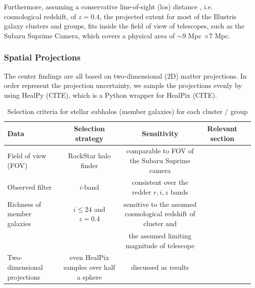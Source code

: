 \documentclass[usenatbib]{mn2e}
\begin{document}
Furthermore, assuming a conservative line-of-sight (los) distance 
, i.e. cosmological redshift, of $z = 0.4$, 
the projected extent for most of the Illustris galaxy clusters and groups, 
fits inside the field of view of telescopes, such as the Subaru Suprime Camera,
which covers a physical area of $\sim 9$ Mpc $\times 7$ Mpc. 

\subsubsection{Spatial Projections}
The center findings are all based on two-dimensional (2D) matter projections.
In order represent the projection uncertainty, we sample the projections evenly
by using HealPy (CITE), which is a Python wrapper for HealPix (CITE).


\begin{table}
\begin{center}
\begin{minipage}{180mm} 
	\caption{ Selection criteria for stellar subhalos (member galaxies) for each
		cluster / group 
\label{tab:member_galaxy_selections}} 
	\begin{tabular}{@{}lcccc@{}}
\hline 
Data &  Selection strategy  & Sensitivity & Relevant section  \\ \hline
Field of view (FOV) & RockStar halo finder& comparable to FOV of the Subaru
Suprime camera &   \\ 
Observed filter & $i$-band & consistent over the redder $r, i, z$ bands &   \\ 
Richness of member galaxies & $i \leq 24$ and $z = 0.4$  & sensitive to
the assumed cosmological redshift of cluster and &    \\ 
& & the assumed limiting magnitude of telescope &   \\
Two-dimensional projections & even HealPix samples over half a sphere &
discussed as results  & \\  
\hline
\end{tabular} 
\label{tab:selection_criteria} 
\footnotesize{
}
\end{minipage}
\end{center} 
\end{table}
\end{document}
